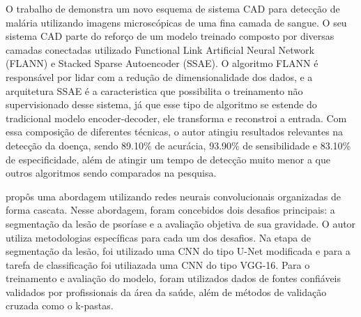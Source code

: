 O trabalho de  demonstra um novo esquema de sistema CAD para detecção de malária utilizando imagens microscópicas de uma fina camada de sangue. O seu sistema CAD parte do reforço de um modelo treinado composto por diversas camadas conectadas utilizado Functional Link Artificial Neural Network (FLANN) e Stacked Sparse Autoencoder (SSAE). O algoritmo FLANN é responsável por lidar com a redução de dimensionalidade dos dados, e a arquitetura SSAE é a caracteristica que possibilita o treinamento não supervisionado desse sistema, já que esse tipo de algoritmo se estende do tradicional modelo encoder-decoder, ele transforma e reconstroi a entrada. Com essa composição de diferentes técnicas, o autor atingiu resultados relevantes na detecção da doença, sendo 89.10\% de acurácia, 93.90\% de sensibilidade e 83.10\% de especificidade, além de atingir um tempo de detecção muito menor a que outros algoritmos sendo comparados na pesquisa.  


 propôs uma abordagem utilizando redes neurais convolucionais organizadas de forma cascata. Nesse abordagem, foram concebidos dois desafios principais: a segmentação da lesão de psoríase e a avaliação objetiva de sua gravidade. O autor utiliza metodologias específicas para cada um dos desafios. Na etapa de segmentação da lesão, foi utilizado uma CNN do tipo U-Net modificada e para a tarefa de classificação foi utiliazada uma CNN do tipo VGG-16. Para o treinamento e avaliação do modelo, foram utilizados dados de fontes confiáveis validados por profissionais da área da saúde, além de métodos de validação cruzada como o k-pastas.


